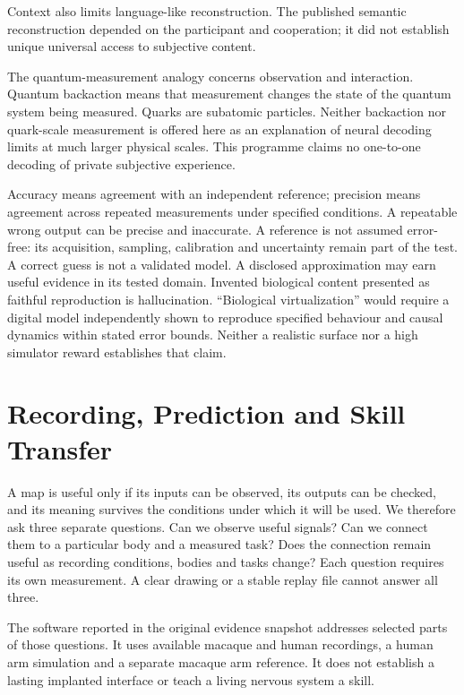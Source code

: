 Context also limits language-like reconstruction. The published semantic reconstruction depended on the participant and cooperation; it did not establish unique universal access to subjective content.\citep{tang2023}

The quantum-measurement analogy concerns observation and interaction. Quantum backaction means that measurement changes the state of the quantum system being measured. Quarks are subatomic particles. Neither backaction nor quark-scale measurement is offered here as an explanation of neural decoding limits at much larger physical scales.\citep{quantum2012} This programme claims no one-to-one decoding of private subjective experience.

Accuracy means agreement with an independent reference; precision means
agreement across repeated measurements under specified conditions. A repeatable
wrong output can be precise and inaccurate. A reference is not assumed
error-free: its acquisition, sampling, calibration and uncertainty remain part
of the test.\citep{nist1297} A correct guess is not a validated model.
A disclosed approximation may earn useful evidence in its tested domain.
Invented biological content presented as faithful reproduction is hallucination.
``Biological virtualization'' would require a digital model independently shown
to reproduce specified behaviour and causal dynamics within stated error bounds.
Neither a realistic surface nor a high simulator reward establishes that claim.

\section{Recording, Prediction and Skill Transfer}

A map is useful only if its inputs can be observed, its outputs can be checked,
and its meaning survives the conditions under which it will be used. We therefore
ask three separate questions. Can we observe useful signals? Can we connect them
to a particular body and a measured task? Does the connection remain useful as
recording conditions, bodies and tasks change? Each question requires its own
measurement. A clear drawing or a stable replay file cannot answer all three.

The software reported in the original evidence snapshot addresses selected
parts of those questions. It uses available macaque and human recordings, a
human arm simulation and a separate macaque arm reference. It does not establish
a lasting implanted interface or teach a living nervous system a skill.

